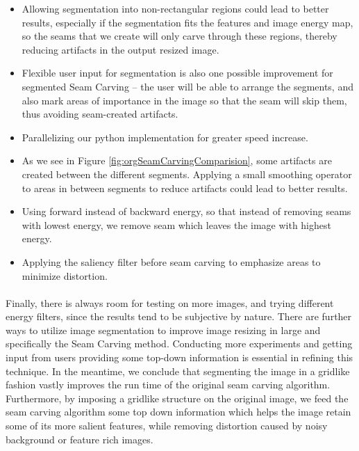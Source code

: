 \documentclass[conference]{acmsiggraph}
\begin{document}
\begin{itemize}
  \item Allowing segmentation into non-rectangular regions could lead to better results, especially if the segmentation fits the features and image energy map, so the seams that we create will only carve through these regions, thereby reducing artifacts in the output resized image.
  \item Flexible user input for segmentation is also one possible improvement for segmented Seam Carving -- the user will be able to arrange the segments, and also mark areas of importance in the image so that the seam will skip them, thus avoiding seam-created artifacts. 
  \item Parallelizing our python implementation for greater speed increase.
  \item As we see in Figure \ref{fig:orgSeamCarvingComparision}, some artifacts are created between the different segments. Applying a small smoothing operator to areas in between segments to reduce artifacts could lead to better results.
  \item Using forward instead of backward energy, so that instead of removing seams with lowest energy, we remove seam which leaves the image with highest energy.
  \item Applying the saliency filter before seam carving to emphasize areas to minimize distortion.  
\end{itemize}


\paragraph{}
Finally, there is always room for testing on more images, and trying different energy filters, since the results tend to be subjective by nature. There are further ways to utilize image segmentation to improve image resizing in large and specifically the Seam Carving method.  Conducting more experiments and getting input from users providing some top-down information is essential in refining this technique.  In the meantime, we conclude that segmenting the image in a gridlike fashion vastly improves the run time of the original seam carving algorithm.  Furthermore, by imposing a gridlike structure on the original image, we feed the seam carving algorithm some top down information which helps the image retain some of its more salient features, while removing distortion caused by noisy background or feature rich images.  



\end{document}
